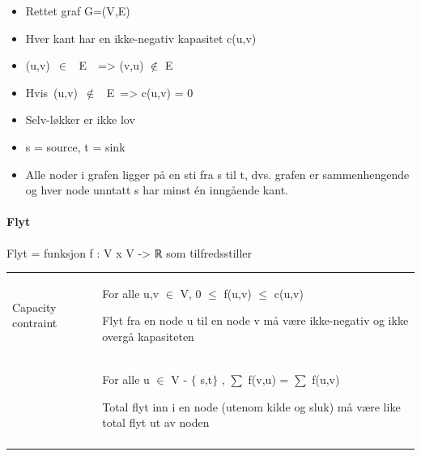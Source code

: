 \documentclass[12pt]{report}
\begin{document}
\begin{itemize}
	\item Rettet graf G=(V,E)\par

	\item Hver kant har en ikke-negativ kapasitet c(u,v)\par

	\item (u,v)\ $ \in $ \ E\ \  =>   (v,u) $ \notin $  E \par

	\item Hvis\ (u,v)\ $ \notin $ \ E\   =>   c(u,v) = 0\par

	\item Selv-løkker er ikke lov\par

	\item s = source, t = sink\par

	\item Alle noder i grafen ligger på en sti fra s til t, dvs. grafen er sammenhengende og hver node unntatt s har minst én inngående kant.
\end{itemize}\par

\paragraph*{Flyt}
Flyt = funksjon f : V x V -> ℝ som tilfredsstiller\par


\vspace{\baselineskip}




\begin{table}[H]
 			\centering
\begin{tabular}{p{1.49in}p{4.36in}}
\hline
\multicolumn{1}{|p{1.49in}}{Capacity contraint} & 
\multicolumn{1}{|p{4.36in}|}{For alle u,v $ \in $  V, 0 $ \leq $  f(u,v) $ \leq $  c(u,v) \par Flyt fra en node u til en node v må være ikke-negativ og ikke overgå kapasiteten} \\
\hhline{--}
\multicolumn{1}{|p{1.49in}}{Flow conservation} & 
\multicolumn{1}{|p{4.36in}|}{For alle u $ \in $  V - $ \{ $ s,t$ \} $ , $ \sum $  f(v,u) = $ \sum $  f(u,v) \par Total flyt inn i en node (utenom kilde og sluk) må være like total flyt ut av noden} \\
\hhline{--}

\end{tabular}
 \end{table}
\end{document}
